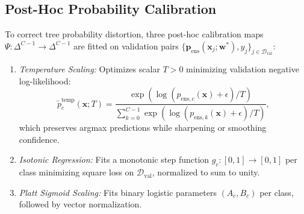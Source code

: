 \documentclass[10pt,journal,twocolumn]{IEEEtran}
\begin{document}
\subsection{Post-Hoc Probability Calibration}
To correct tree probability distortion, three post-hoc calibration maps $\Psi: \Delta^{C-1} \to \Delta^{C-1}$ are fitted on validation pairs $\{\mathbf{p}_{\text{ens}}(\mathbf{x}_j; \mathbf{w}^*), y_j\}_{j \in \mathcal{D}_{\text{val}}}$:
\begin{enumerate}
    \item \emph{Temperature Scaling:} Optimizes scalar $T > 0$ minimizing validation negative log-likelihood:
    \begin{equation}
    \tilde{p}_c^{\text{temp}}(\mathbf{x}; T) = \frac{\exp(\log(p_{\text{ens},c}(\mathbf{x}) + \epsilon) / T)}{\sum_{k=0}^{C-1} \exp(\log(p_{\text{ens},k}(\mathbf{x}) + \epsilon) / T)},
    \end{equation}
    which preserves argmax predictions while sharpening or smoothing confidence.
    \item \emph{Isotonic Regression:} Fits a monotonic step function $g_c: [0,1] \to [0,1]$ per class minimizing square loss on $\mathcal{D}_{\text{val}}$, normalized to sum to unity.
    \item \emph{Platt Sigmoid Scaling:} Fits binary logistic parameters $(A_c, B_c)$ per class, followed by vector normalization.
\end{enumerate}
\end{document}
